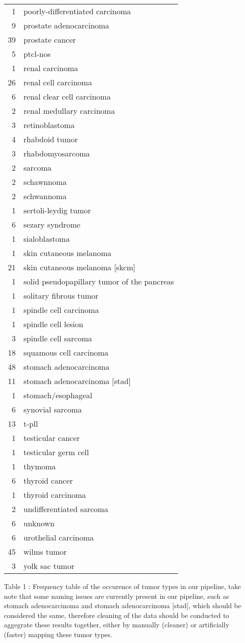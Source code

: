 \documentclass[11pt,]{article}
\begin{document}
\begin{longtable}[]{@{}rl@{}}
1 & poorly-differentiated carcinoma\tabularnewline
9 & prostate adenocarcinoma\tabularnewline
39 & prostate cancer\tabularnewline
5 & ptcl-nos\tabularnewline
1 & renal carcinoma\tabularnewline
26 & renal cell carcinoma\tabularnewline
6 & renal clear cell carcinoma\tabularnewline
2 & renal medullary carcinoma\tabularnewline
3 & retinoblastoma\tabularnewline
4 & rhabdoid tumor\tabularnewline
3 & rhabdomyosarcoma\tabularnewline
2 & sarcoma\tabularnewline
2 & schawnnoma\tabularnewline
2 & schwannoma\tabularnewline
1 & sertoli-leydig tumor\tabularnewline
6 & sezary syndrome\tabularnewline
1 & sialoblastoma\tabularnewline
1 & skin cutaneous melanoma\tabularnewline
21 & skin cutaneous melanoma {[}skcm{]}\tabularnewline
1 & solid pseudopapillary tumor of the pancreas\tabularnewline
1 & solitary fibrous tumor\tabularnewline
1 & spindle cell carcinoma\tabularnewline
1 & spindle cell lesion\tabularnewline
3 & spindle cell sarcoma\tabularnewline
18 & squamous cell carcinoma\tabularnewline
48 & stomach adenocarcinoma\tabularnewline
11 & stomach adenocarcinoma {[}stad{]}\tabularnewline
1 & stomach/esophageal\tabularnewline
6 & synovial sarcoma\tabularnewline
13 & t-pll\tabularnewline
1 & testicular cancer\tabularnewline
1 & testicular germ cell\tabularnewline
1 & thymoma\tabularnewline
6 & thyroid cancer\tabularnewline
1 & thyroid carcinoma\tabularnewline
2 & undifferentiated sarcoma\tabularnewline
6 & unknown\tabularnewline
6 & urothelial carcinoma\tabularnewline
45 & wilms tumor\tabularnewline
3 & yolk sac tumor\tabularnewline
\bottomrule
\end{longtable}

Table 1 : Frequency table of the occurence of tumor types in our
pipeline, take note that some naming issues are currently present in our
pipeline, such as stomach adenocarcinoma and stomach adenocarcinoma
{[}stad{]}, which should be considered the same, therefore cleaning of
the data should be conducted to aggegrate these results together, either
by manually (cleaner) or artificially (faster) mapping these tumor
types.





\newpage
\singlespacing 

\end{document}
